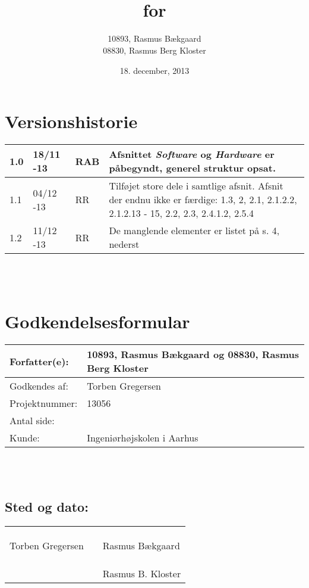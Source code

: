 \documentclass[oneside, 12pt]{memoir}
\title{\DocumentType \\ for \\ \ProjectName}
\date{18. december, 2013}
\author{10893, Rasmus Bækgaard\\08830, Rasmus Berg Kloster}
\begin{document}
\begin{titlingpage}
  \maketitle
\end{titlingpage}


\section*{Versionshistorie}
\begin{tabular}{p{}|p{}|p{}|p{}}
1.0 & 18/11 -13 & RAB & Afsnittet \textit{Software} og \textit{Hardware} er påbegyndt, generel struktur opsat.\\ \hline
1.1 & 04/12 -13 & RR & Tilføjet store dele i samtlige afsnit. Afsnit der endnu ikke er færdige: 1.3, 2, 2.1, 2.1.2.2, 2.1.2.13 - 15, 2.2, 2.3, 2.4.1.2, 2.5.4 
\\ \hline 
1.2 & 11/12 -13 & RR & De manglende elementer er listet på s. 4, nederst
\\  \hline
\end{tabular} 
\\
\\
\section*{Godkendelsesformular}
\begin{tabular}{p{}|p{}}
\hline 
Forfatter(e): & 10893, Rasmus Bækgaard og 08830, Rasmus Berg Kloster\\ 
\hline 
Godkendes af: & Torben Gregersen \\ 
\hline
Projektnummer: & 13056\\
\hline
Antal side: & \pageref{LastPage} \\
\hline 
Kunde: & Ingeniørhøjskolen i Aarhus \\
\hline
\end{tabular} 
\\
\\
\subsection*{Sted og dato:}
\begin{tabular}{p{} p{} p{}}
&& \\
&& \\
\underline{\qquad \qquad \qquad \qquad \qquad} & \qquad \qquad \qquad & \underline{\qquad \qquad \qquad \qquad \qquad}  \\ 
Torben Gregersen & & Rasmus Bækgaard \\ \\\\
&&  \underline{\qquad \qquad \qquad \qquad \qquad}  \\
& & Rasmus B. Kloster
\end{tabular} 
\end{document}
